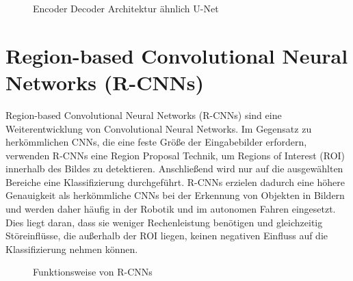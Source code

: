 \begin{figure}
    \centering
    
    \caption{Encoder Decoder Architektur ähnlich U-Net}
    \label{fig:FCN}
\end{figure}

\section{Region-based Convolutional Neural Networks (R-CNNs)}
Region-based Convolutional Neural Networks (R-CNNs) sind eine Weiterentwicklung
von Convolutional Neural Networks. Im Gegensatz zu herkömmlichen CNNs, die eine
feste Größe der Eingabebilder erfordern, verwenden R-CNNs eine Region Proposal
Technik, um Regions of Interest (ROI) innerhalb des Bildes zu detektieren.
Anschließend wird nur auf die ausgewählten Bereiche eine Klassifizierung
durchgeführt. R-CNNs erzielen dadurch eine höhere Genauigkeit als herkömmliche
CNNs bei der Erkennung von Objekten in Bildern und werden daher häufig in der
Robotik und im autonomen Fahren eingesetzt. Dies liegt daran, dass sie weniger
Rechenleistung benötigen und gleichzeitig Störeinflüsse, die außerhalb der ROI
liegen, keinen negativen Einfluss auf die Klassifizierung nehmen können.
\cite{Girshick_2015_ICCV}

\begin{figure}
    \centering
    
    \caption{Funktionsweise von R-CNNs}
    \label{fig:CNN}
\end{figure}